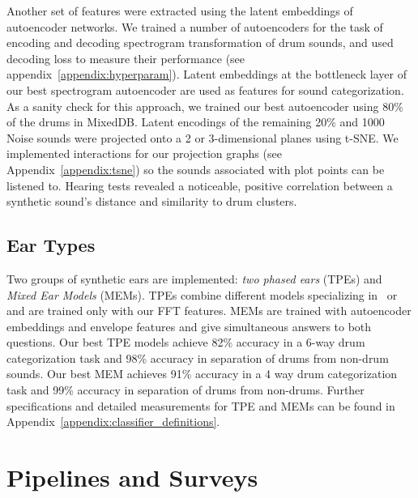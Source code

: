 \documentclass[runningheads,a4paper]{llncs}
\begin{document}
Another set of features were extracted using the latent embeddings of autoencoder networks. We trained a number of autoencoders for the task of encoding and decoding spectrogram transformation of drum sounds, and used decoding loss to measure their performance (see appendix~\ref{appendix:hyperparam}). Latent embeddings at the bottleneck layer of our best spectrogram autoencoder are used as features for sound categorization.  As a sanity check for this approach, we trained our best autoencoder using 80\% of the drums in MixedDB. Latent encodings of the remaining 20\% and 1000 Noise sounds were projected onto a 2 or 3-dimensional planes using t-SNE. We implemented interactions for our projection graphs (see Appendix~\ref{appendix:tsne}) so the sounds associated with plot points can be listened to. Hearing tests revealed a noticeable, positive correlation between a synthetic sound's distance and similarity to drum clusters.
\subsection{Ear Types}
\label{classifiers}
Two groups of synthetic ears are implemented: \emph{two phased ears} (TPEs) and \emph{Mixed Ear Models} (MEMs). TPEs combine different models specializing in ~\descfirst or ~\descsecond~ and are trained only with our FFT features. MEMs are trained with autoencoder embeddings and envelope features and give simultaneous answers to both questions. Our best TPE models achieve 82\% accuracy in a 6-way drum categorization task and 98\% accuracy in separation of drums from non-drum sounds. Our best MEM achieves 91\% accuracy in a 4 way drum categorization task and 99\% accuracy in separation of drums from non-drums. Further specifications and detailed measurements for TPE and MEMs can be found in Appendix~\ref{appendix:classifier_definitions}. 
\section{Pipelines and Surveys}
\label{surveys}
\end{document}
